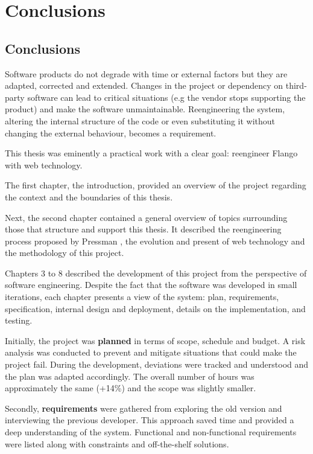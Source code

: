 \chapter{Conclusions}
\section{Conclusions}
Software products do not degrade with time or external factors but they are adapted, corrected and extended.
Changes in the project or dependency on third-party software can lead to critical situations  (e.g the vendor stops supporting the product) and make the software unmaintainable.
Reengineering the system, altering the internal structure of the code or even substituting it without changing the external behaviour, becomes a requirement.

This thesis was eminently a practical work with a clear goal: reengineer Flango \cm with web technology.

The first chapter, the introduction, provided an overview of the project regarding the context and the boundaries of this thesis.

Next, the second chapter contained a general overview of topics surrounding those that structure and support this thesis.
It described the reengineering process proposed by Pressman \cite{Pressman:2007}, the evolution and present of web technology and the methodology of this project.

Chapters 3 to 8 described the development of this project from the perspective of software engineering.
Despite the fact that the software was developed in small iterations, each chapter presents a view of the system: plan, requirements, specification, internal design and deployment, details on the implementation, and testing.

Initially, the project was \textbf{planned} in terms of scope, schedule and budget. 
A risk analysis was conducted to prevent and mitigate situations that could make the project fail.
During the development, deviations were tracked and understood and the plan was adapted accordingly.
The overall number of hours was approximately the same (+14\%) and the scope was slightly smaller.

Secondly, \textbf{requirements} were gathered from exploring the old version and interviewing the previous developer.
This approach saved time and provided a deep understanding of the system.
Functional and non-functional requirements were listed along with constraints and off-the-shelf solutions.

